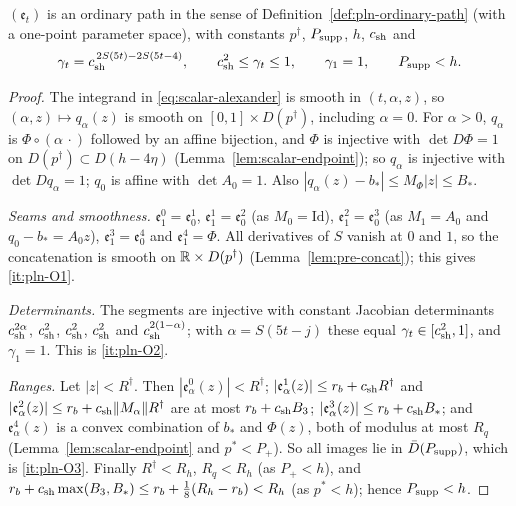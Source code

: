 \begin{lemma}\label{lem:scalar-ordinary}
$(\mathfrak e_t)$ is an ordinary path in the sense of Definition~\ref{def:pln-ordinary-path} (with a one-point
parameter space), with constants $p^\dagger$, $P_{\rm supp}$, $h$, $c_{\rm sh}$ and
\[
 \gamma_t=c_{\rm sh}^{\,2S(5t)-2S(5t-4)},\qquad c_{\rm sh}^2\le\gamma_t\le1,\qquad\gamma_1=1,
 \qquad P_{\rm supp}<h.
\]
{\normalfont {}}
\end{lemma}

\begin{proof}
The integrand in \eqref{eq:scalar-alexander} is smooth in $(t,\alpha,z)$, so $(\alpha,z)\mapsto q_\alpha(z)$ is smooth on
$[0,1]\times D(p^\dagger)$, including $\alpha=0$. For $\alpha>0$, $q_\alpha$ is $\Phi\circ(\alpha\,\cdot)$ followed by an affine
bijection, and $\Phi$ is injective with $\det D\Phi=1$ on $D(p^\dagger)\subset D(h-4\eta)$ (Lemma~\ref{lem:scalar-endpoint});
so $q_\alpha$ is injective with $\det Dq_\alpha=1$; $q_0$ is affine with $\det A_0=1$. Also
$|q_\alpha(z)-b_*|\le M_\Phi|z|\le B_*$.

\emph{Seams and smoothness.} $\mathfrak e^0_1=\mathfrak e^1_0$, $\mathfrak e^1_1=\mathfrak e^2_0$ (as $M_0=\mathrm{Id}$),
$\mathfrak e^2_1=\mathfrak e^3_0$ (as $M_1=A_0$ and $q_0-b_*=A_0z$), $\mathfrak e^3_1=\mathfrak e^4_0$ and $\mathfrak e^4_1=\Phi$.
All derivatives of $S$ vanish at $0$ and $1$, so the concatenation is smooth on $\mathbb{R}\times D(p^\dagger)$
(Lemma~\ref{lem:pre-concat}); this gives \ref{it:pln-O1}.

\emph{Determinants.} The segments are injective with constant Jacobian determinants $c_{\rm sh}^{2\alpha}$, $c_{\rm sh}^2$,
$c_{\rm sh}^2$, $c_{\rm sh}^2$ and $c_{\rm sh}^{2(1-\alpha)}$; with $\alpha=S(5t-j)$ these equal $\gamma_t\in[c_{\rm sh}^2,1]$, and
$\gamma_1=1$. This is \ref{it:pln-O2}.

\emph{Ranges.} Let $|z|<R^\dagger$. Then $|\mathfrak e^0_\alpha(z)|<R^\dagger$; $|\mathfrak e^1_\alpha(z)|\le r_b+c_{\rm sh}R^\dagger$ and
$|\mathfrak e^2_\alpha(z)|\le r_b+c_{\rm sh}\|M_\alpha\|R^\dagger$ are at most $r_b+c_{\rm sh}B_3$;
$|\mathfrak e^3_\alpha(z)|\le r_b+c_{\rm sh}B_*$; and $\mathfrak e^4_\alpha(z)$ is a convex combination of $b_*$ and $\Phi(z)$,
both of modulus at most $R_q$ (Lemma~\ref{lem:scalar-endpoint} and $p^*<P_+$). So all images lie in
$\bar D(P_{\rm supp})$, which is \ref{it:pln-O3}. Finally $R^\dagger<R_h$, $R_q<R_h$ (as $P_+<h$), and
$r_b+c_{\rm sh}\max(B_3,B_*)\le r_b+\frac18(R_h-r_b)<R_h$ (as $p^*<h$); hence $P_{\rm supp}<h$.
\end{proof}


